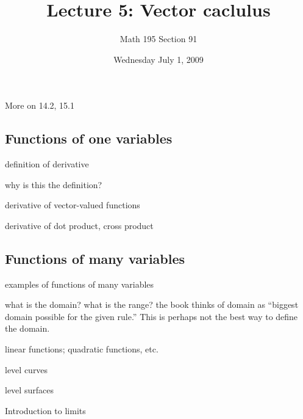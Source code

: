 \documentclass[12pt]{article}
\title{Lecture 5: Vector caclulus}
\author{Math 195 Section 91}
\date{Wednesday July  1, 2009}
\begin{document}
\maketitle

More on 14.2, 15.1

\subsection{Functions of one variables}

definition of derivative

why is this the definition?

derivative of vector-valued functions

derivative of dot product, cross product

\subsection{Functions of many variables}

examples of functions of many variables

what is the domain?  what is the range?  the book thinks of domain as
``biggest domain possible for the given rule.''  This is perhaps not
the best way to define the domain.

linear functions; quadratic functions, etc.

level curves

level surfaces

Introduction to limits
\end{document}
